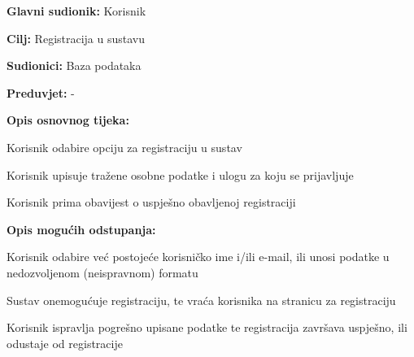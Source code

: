 					
					\noindent {}
					\begin{packed_item}
	
						\item \textbf{Glavni sudionik: }Korisnik
						\item  \textbf{Cilj:} Registracija u sustavu
						\item  \textbf{Sudionici:} Baza podataka
						\item  \textbf{Preduvjet:} -
						\item  \textbf{Opis osnovnog tijeka:}
						
						\item[] \begin{packed_enum}
	
							\item Korisnik odabire opciju za registraciju u sustav
							\item Korisnik upisuje tražene osobne podatke i ulogu za koju se prijavljuje
							\item Korisnik prima obavijest o uspješno obavljenoj registraciji
						\end{packed_enum}
						
						\item  \textbf{Opis mogućih odstupanja:}
						
						\item[] \begin{packed_item}
	
							\item[2.a] Korisnik odabire već postojeće korisničko ime i/ili e-mail, ili unosi podatke u nedozvoljenom (neispravnom) formatu
							\item[] \begin{packed_enum}
								
								\item Sustav onemogućuje registraciju, te vraća korisnika na stranicu za registraciju
								\item Korisnik ispravlja pogrešno upisane podatke te registracija završava uspješno, ili odustaje od registracije
								
							\end{packed_enum}
							
							
						\end{packed_item}
					\end{packed_item}
					
